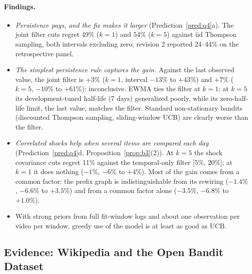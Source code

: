 \documentclass[11pt]{article}
\theoremstyle{definition}
\theoremstyle{remark}
\begin{document}
\paragraph{Findings.}
\begin{itemize}
\item \emph{Persistence pays, and the fix makes it larger} (Prediction~\ref{pred:q4}a). The joint filter cuts regret 49\% ($k=1$) and 54\% ($k=5$) against iid Thompson sampling, both intervals excluding zero; revision 2 reported 24--44\% on the retrospective panel.
\item \emph{The simplest persistence rule captures the gain.} Against the last observed value, the joint filter is $+3\%$ ($k=1$, interval $-13\%$ to $+43\%$) and $+7\%$ ($k=5$, $-10\%$ to $+61\%$): inconclusive. EWMA ties the filter at $k=1$; at $k=5$ its development-tuned half-life (7 days) generalized poorly, while its zero-half-life limit, the last value, matches the filter. Standard non-stationary bandits (discounted Thompson sampling, sliding-window UCB) are clearly worse than the filter.
\item \emph{Correlated shocks help when several items are compared each day} (Prediction~\ref{pred:q4}d, Proposition~\ref{prop:b3}(2)). At $k=5$ the shock covariance cuts regret 11\% against the temporal-only filter [5\%, 20\%]; at $k=1$ it does nothing ($-1\%$, $-6\%$ to $+4\%$). Most of the gain comes from a common factor: the prefix graph is indistinguishable from its rewiring ($-1.4\%$, $-6.6\%$ to $+3.5\%$) and from a common factor alone ($-3.5\%$, $-6.8\%$ to $+1.0\%$).
\item With strong priors from full fit-window logs and about one observation per video per window, greedy use of the model is at least as good as UCB.
\end{itemize}

\subsection{Evidence: Wikipedia and the Open Bandit Dataset}
\end{document}
